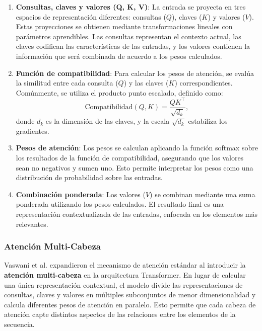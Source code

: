 \begin{enumerate}
    \item \textbf{Consultas, claves y valores (Q, K, V)}:
    La entrada se proyecta en tres espacios de representación diferentes: consultas (\(Q\)), claves (\(K\)) y valores (\(V\)). Estas proyecciones se obtienen mediante transformaciones lineales con parámetros aprendibles. Las consultas representan el contexto actual, las claves codifican las características de las entradas, y los valores contienen la información que será combinada de acuerdo a los pesos calculados.

    \item \textbf{Función de compatibilidad}:
    Para calcular los pesos de atención, se evalúa la similitud entre cada consulta (\(Q\)) y las claves (\(K\)) correspondientes. Comúnmente, se utiliza el producto punto escalado, definido como:
    \[
    \text{Compatibilidad}(Q, K) = \frac{QK^\top}{\sqrt{d_k}},
    \]
    donde \(d_k\) es la dimensión de las claves, y la escala \(\sqrt{d_k}\) estabiliza los gradientes.

    \item \textbf{Pesos de atención}:
    Los pesos se calculan aplicando la función softmax sobre los resultados de la función de compatibilidad, asegurando que los valores sean no negativos y sumen uno. Esto permite interpretar los pesos como una distribución de probabilidad sobre las entradas.

    \item \textbf{Combinación ponderada}:
    Los valores (\(V\)) se combinan mediante una suma ponderada utilizando los pesos calculados. El resultado final es una representación contextualizada de las entradas, enfocada en los elementos más relevantes.
\end{enumerate}

\subsubsection*{Atención Multi-Cabeza}

Vaswani et al. \cite{vaswani2017attention} expandieron el mecanismo de atención estándar al introducir la \textbf{atención multi-cabeza} en la arquitectura Transformer. En lugar de calcular una única representación contextual, el modelo divide las representaciones de consultas, claves y valores en múltiples subconjuntos de menor dimensionalidad y calcula diferentes pesos de atención en paralelo. Esto permite que cada cabeza de atención capte distintos aspectos de las relaciones entre los elementos de la secuencia.

